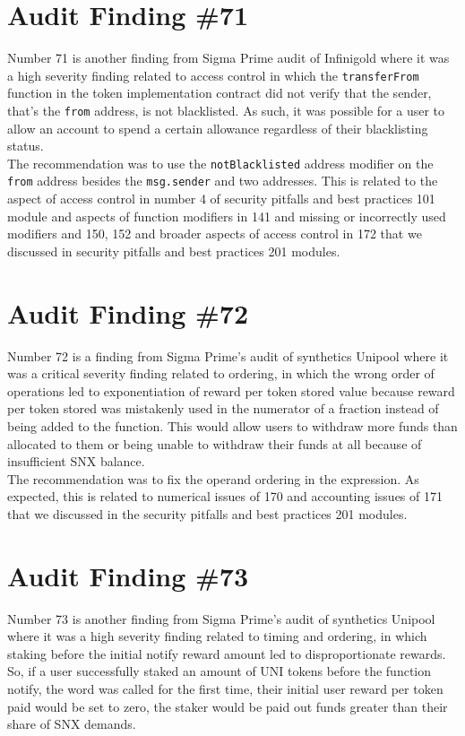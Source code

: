 \section{Audit Finding \#71}

Number 71 is another finding from Sigma Prime audit of Infinigold where it was a high severity finding related to access control in which the \verb|transferFrom| function in the token implementation contract did not verify that the sender, that's the \verb|from| address, is not blacklisted. As such, it was possible for a user to allow an account to spend a certain allowance regardless of their blacklisting status.\\

The recommendation was to use the \verb|notBlacklisted| address modifier on the \verb|from| address besides the \verb|msg.sender| and two addresses. This is related to the aspect of access control in number 4 of security pitfalls and best practices 101 module and aspects of function modifiers in 141 and missing or incorrectly used modifiers and 150, 152 and broader aspects of access control in 172 that we discussed in security pitfalls and best practices 201 modules.

\section{Audit Finding \#72}

Number 72 is a finding from Sigma Prime's audit of synthetics Unipool where it was a critical severity finding related to ordering, in which the wrong order of operations led to exponentiation of reward per token stored value because reward per token stored was mistakenly used in the numerator of a fraction instead of being added to the function. This would allow users to withdraw more funds than allocated to them or being unable to withdraw their funds at all because of insufficient SNX balance.\\

The recommendation was to fix the operand ordering in the expression. As expected, this is related to numerical issues of 170 and accounting issues of 171 that we discussed in the security pitfalls and best practices 201 modules.

\section{Audit Finding \#73}

Number 73 is another finding from Sigma Prime's audit of synthetics Unipool where it was a high severity finding related to timing and ordering, in which staking before the initial notify reward amount led to disproportionate rewards. So, if a user successfully staked an amount of UNI tokens before the function notify, the word was called for the first time, their initial user reward per token paid would be set to zero, the staker would be paid out funds greater than their share of SNX demands.\\

